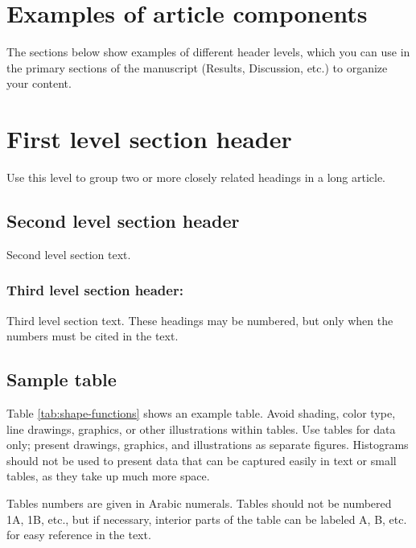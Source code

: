 \documentclass[9pt,twocolumn,twoside,lineno]{gsajnl}
\begin{document}
\section{Examples of article components}
\label{sec:examples}

The sections below show examples of different header levels, which you can use in the primary sections of the manuscript (Results, Discussion, etc.) to organize your content.

\section{First level section header}

Use this level to group two or more closely related headings in a long article.

\subsection{Second level section header}

Second level section text.

\subsubsection{Third level section header:}

Third level section text. These headings may be numbered, but only when the numbers must be cited in the text.


\subsection{Sample table}

Table \ref{tab:shape-functions} shows an example table. Avoid shading, color type, line drawings, graphics, or other illustrations within tables. Use tables for data only; present drawings, graphics, and illustrations as separate figures. Histograms should not be used to present data that can be captured easily in text or small tables, as they take up much more space.

Tables numbers are given in Arabic numerals. Tables should not be numbered 1A, 1B, etc., but if necessary, interior parts of the table can be labeled A, B, etc. for easy reference in the text.
\end{document}
